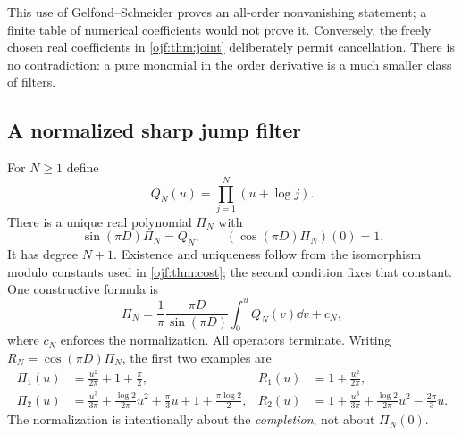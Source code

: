 \documentclass[11pt,a4paper]{article}
\numberwithin{equation}{section}
\theoremstyle{definition}\newtheorem{definition}[theorem]{Definition}
\theoremstyle{remark}\newtheorem{remark}[theorem]{Remark}
\begin{document}
This use of Gelfond--Schneider proves an all-order nonvanishing statement;
a finite table of numerical coefficients would not prove it. Conversely,
the freely chosen real coefficients in \cref{ojf:thm:joint} deliberately
permit cancellation. There is no contradiction: a pure monomial in the
order derivative is a much smaller class of filters.

\subsection{A normalized sharp jump filter}
For $N\ge1$ define
\begin{equation}\label{ojf:eq:QN}
 Q_N(u)=\prod_{j=1}^N(u+\log j).
\end{equation}
There is a unique real polynomial $\Pi_N$ with
\begin{equation}\label{ojf:eq:PiN}
 \sin(\pi D)\Pi_N=Q_N,\qquad
      (\cos(\pi D)\Pi_N)(0)=1.
\end{equation}
It has degree $N+1$. Existence and uniqueness follow from the
isomorphism modulo constants used in \cref{ojf:thm:cost}; the second
condition fixes that constant. One constructive formula is
\[
 \Pi_N=\frac1\pi\frac{\pi D}{\sin(\pi D)}
               \int_0^u Q_N(v)\dd v+c_N,
\]
where $c_N$ enforces the normalization. All operators terminate.
Writing $R_N=\cos(\pi D)\Pi_N$, the first two examples are
\begin{align}
 \Pi_1(u)&=\frac{u^2}{2\pi}+1+\frac\pi2,
 &R_1(u)&=1+\frac{u^2}{2\pi},\label{ojf:eq:Pi1}\\
 \Pi_2(u)&=\frac{u^3}{3\pi}+
       \frac{\log2}{2\pi}u^2+\frac\pi3u+1+\frac{\pi\log2}{2},
 &R_2(u)&=1+\frac{u^3}{3\pi}+
       \frac{\log2}{2\pi}u^2-\frac{2\pi}{3}u.
                                                        \label{ojf:eq:Pi2}
\end{align}
The normalization is intentionally about the \emph{completion}, not
about $\Pi_N(0)$.
\end{document}
